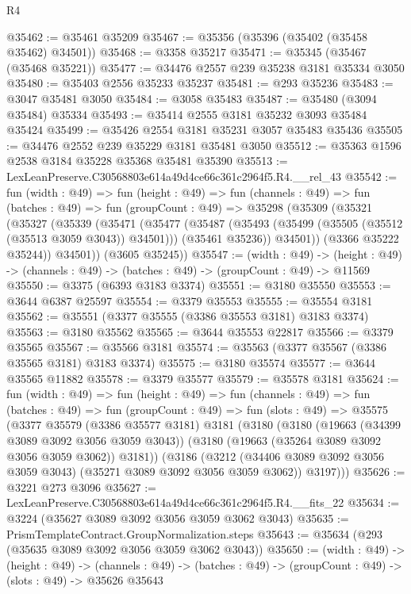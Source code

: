 \begin{lexlean}{R4}
\begin{coremodule}
@35462 := @35461 @35209
@35467 := @35356 (@35396 (@35402 (@35458 @35462) @34501))
@35468 := @3358 @35217
@35471 := @35345 (@35467 (@35468 @35221))
@35477 := @34476 @2557 @239 @35238 @3181 @35334 @3050
@35480 := @35403 @2556 @35233 @35237
@35481 := @293 @35236
@35483 := @3047 @35481 @3050
@35484 := @3058 @35483
@35487 := @35480 (@3094 @35484) @35334
@35493 := @35414 @2555 @3181 @35232 @3093 @35484 @35424
@35499 := @35426 @2554 @3181 @35231 @3057 @35483 @35436
@35505 := @34476 @2552 @239 @35229 @3181 @35481 @3050
@35512 := @35363 @1596 @2538 @3184 @35228 @35368 @35481 @35390
@35513 := LexLeanPreserve.C30568803e614a49d4ce66c361c2964f5.R4.__rel_43
@35542 := fun (width : @49) =>
  fun (height : @49) =>
  fun (channels : @49) =>
  fun (batches : @49) =>
  fun (groupCount : @49) =>
  @35298
    (@35309
      (@35321
        (@35327
          (@35339
            (@35471
              (@35477
                (@35487
                  (@35493 (@35499 (@35505 (@35512 (@35513 @3059 @3043)) @34501)))
                  (@35461 @35236))
                @34501))
            (@3366 @35222 @35244))
          @34501))
      (@3605 @35245))
@35547 := (width : @49) ->
  (height : @49) -> (channels : @49) -> (batches : @49) -> (groupCount : @49) -> @11569
@35550 := @3375 (@6393 @3183 @3374)
@35551 := @3180 @35550
@35553 := @3644 @6387 @25597
@35554 := @3379 @35553
@35555 := @35554 @3181
@35562 := @35551 (@3377 @35555 (@3386 @35553 @3181) @3183 @3374)
@35563 := @3180 @35562
@35565 := @3644 @35553 @22817
@35566 := @3379 @35565
@35567 := @35566 @3181
@35574 := @35563 (@3377 @35567 (@3386 @35565 @3181) @3183 @3374)
@35575 := @3180 @35574
@35577 := @3644 @35565 @11882
@35578 := @3379 @35577
@35579 := @35578 @3181
@35624 := fun (width : @49) =>
  fun (height : @49) =>
  fun (channels : @49) =>
  fun (batches : @49) =>
  fun (groupCount : @49) =>
  fun (slots : @49) =>
  @35575
    (@3377
      @35579
      (@3386 @35577 @3181)
      @3181
      (@3180
        (@3180
          (@19663 (@34399 @3089 @3092 @3056 @3059 @3043))
          (@3180 (@19663 (@35264 @3089 @3092 @3056 @3059 @3062)) @3181))
        (@3186
          (@3212 (@34406 @3089 @3092 @3056 @3059 @3043) (@35271 @3089 @3092 @3056 @3059 @3062))
          @3197)))
@35626 := @3221 @273 @3096
@35627 := LexLeanPreserve.C30568803e614a49d4ce66c361c2964f5.R4.__fits_22
@35634 := @3224 (@35627 @3089 @3092 @3056 @3059 @3062 @3043)
@35635 := PrismTemplateContract.GroupNormalization.steps
@35643 := @35634 (@293 (@35635 @3089 @3092 @3056 @3059 @3062 @3043))
@35650 := (width : @49) ->
  (height : @49) ->
  (channels : @49) -> (batches : @49) -> (groupCount : @49) -> (slots : @49) -> @35626 @35643

\end{coremodule}
\end{lexlean}
